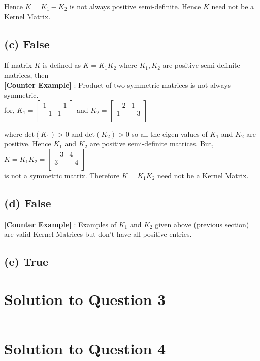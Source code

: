 \documentclass[a4paper,11pt]{article}
\begin{document}
Hence ${K = K_1 - K_2}$ is not always positive semi-definite. Hence $K$ need not be a Kernel Matrix.
\subsection{(c) False}
If matrix $K$ is defined as ${K = K_1K_2}$ where ${K_1 , K_2}$ are positive semi-definite matrices, then\\
\textbf{[Counter Example]} : Product of two symmetric matrices is not always symmetric. \\
for, ${K_1 =
\begin{bmatrix}
       1 & -1 \\[0.3em]
       -1 & 1 \\[0.3em]
\end{bmatrix}
}$ and ${K_2 =
\begin{bmatrix}
       -2 & 1 \\[0.3em]
       1 & -3 \\[0.3em]
\end{bmatrix}
}$

where $\text{det}(K_1) > 0$ and $\text{det}(K_2) > 0$ so all the eigen values of $K_1$ and $K_2$ are positive. 
Hence $K_1$ and $K_2$ are positive semi-definite matrices. But, \\${K = K_1K_2 = 
\begin{bmatrix}
       -3 & 4 \\[0.3em]
       3 & -4 \\[0.3em]
\end{bmatrix}
}$\\
is not a symmetric matrix. Therefore ${K = K_1K_2}$ need not be a Kernel Matrix.
\subsection{(d) False}
\textbf{[Counter Example]} : Examples of $K_1$ and $K_2$ given above (previous section) are valid Kernel Matrices but don't have all positive entries.
\subsection{(e) True}


\section{Solution to Question 3}
\inputminted[baselinestretch=1, fontsize=\small, breaklines=true]{octave}{../gaussian_kernel.m}
\section{Solution to Question 4}
\inputminted[baselinestretch=1, fontsize=\small, breaklines=true]{octave}{../parzen_classify.m}
\end{document}

